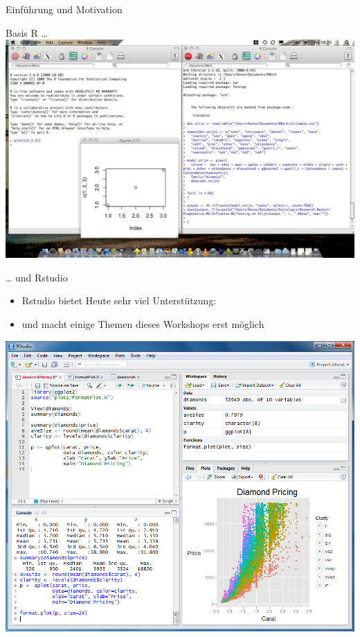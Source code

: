 \documentclass[ignorenonframetext,]{beamer}
\providecommand{\tightlist}{%
\setlength{\itemsep}{0pt}\setlength{\parskip}{0pt}}
\begin{document}
\begin{frame}[fragile]{Einführung und Motivation}
\begin{block}{Basis R \ldots{}}
\includegraphics{./tex2pdf.9796/2c652796da602b9efe1dca344441c9ada66f4fde.jpg}

\end{block}

\begin{block}{\ldots{} und Rstudio}

\begin{itemize}
\tightlist
\item
  Rstudio bietet Heute sehr viel Unterstützung:
\item
  und macht einige Themen dieses Workshops erst möglich
\end{itemize}

\includegraphics{./tex2pdf.9796/692f3658d35df168276cf46e3e083f908a5cc105.png}


\end{block}
\end{frame}
\end{document}
